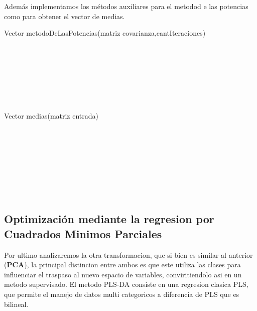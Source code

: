 Además implementamos los métodos auxiliares para el metodod e las potencias como para obtener el vector de medias.

\begin{algorithm}
    \begin{algorithmic}[1]\parskip=2mm
        \caption{Vector metodoDeLasPotencias(matriz covarianza,cantIteraciones)}
        \\
        \\
        \\
        \\
        \\
        \\
    \end{algorithmic}
\end{algorithm}



\begin{algorithm}
    \begin{algorithmic}[1]\parskip=2mm
        \caption{Vector medias(matriz entrada)}
        \\
        \\
        \\
        \\
        \\
        \\
        \\
    \end{algorithmic}
\end{algorithm}

\subsection {Optimización mediante la regresion por Cuadrados Minimos Parciales}
Por ultimo analizaremos la otra transformacion, que si bien es similar al anterior (\textbf{PCA}), la principal distincion entre ambos es que este utiliza las clases para influenciar el traspaso al nuevo espacio de variables, conviritiendolo asi en un metodo supervisado.
El metodo PLS-DA consiste en una regresion clasica PLS, que permite el manejo de datos multi categoricos a diferencia de PLS que es bilineal.

